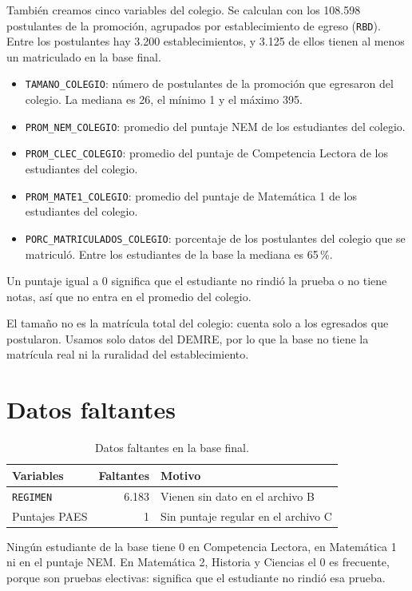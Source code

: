 \documentclass[11pt,letterpaper]{article}
\begin{document}
También creamos cinco variables del colegio. Se calculan con los 108.598 postulantes de la promoción, agrupados por establecimiento de egreso (\texttt{RBD}). Entre los postulantes hay 3.200 establecimientos, y 3.125 de ellos tienen al menos un matriculado en la base final.

\begin{itemize}
\item \texttt{TAMANO\_COLEGIO}: número de postulantes de la promoción que egresaron del colegio. La mediana es 26, el mínimo 1 y el máximo 395.
\item \texttt{PROM\_NEM\_COLEGIO}: promedio del puntaje NEM de los estudiantes del colegio.
\item \texttt{PROM\_CLEC\_COLEGIO}: promedio del puntaje de Competencia Lectora de los estudiantes del colegio.
\item \texttt{PROM\_MATE1\_COLEGIO}: promedio del puntaje de Matemática 1 de los estudiantes del colegio.
\item \texttt{PORC\_MATRICULADOS\_COLEGIO}: porcentaje de los postulantes del colegio que se matriculó. Entre los estudiantes de la base la mediana es 65\,\%.
\end{itemize}

Un puntaje igual a 0 significa que el estudiante no rindió la prueba o no tiene notas, así que no entra en el promedio del colegio.

El tamaño no es la matrícula total del colegio: cuenta solo a los egresados que postularon. Usamos solo datos del DEMRE, por lo que la base no tiene la matrícula real ni la ruralidad del establecimiento.

\section{Datos faltantes}

\begin{table}[h]
\centering
\begin{tabular}{p{6.5cm}rp{5.5cm}}
\toprule
Variables & Faltantes & Motivo \\
\midrule
\texttt{REGIMEN} & 6.183 & Vienen sin dato en el archivo B \\
Puntajes PAES & 1 & Sin puntaje regular en el archivo C \\
\bottomrule
\end{tabular}
\caption{Datos faltantes en la base final.}
\end{table}

Ningún estudiante de la base tiene 0 en Competencia Lectora, en Matemática 1 ni en el puntaje NEM. En Matemática 2, Historia y Ciencias el 0 es frecuente, porque son pruebas electivas: significa que el estudiante no rindió esa prueba.
\end{document}
